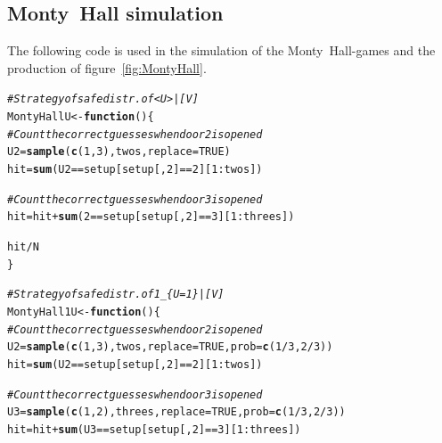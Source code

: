 \documentclass[twoside,a4paper]{article}
\makeatletter
\theoremstyle{plain}
\theoremstyle{definition}
\theoremstyle{remark}
\numberwithin{equation}{section}
\newcommand{\hlnum}[1]{\textcolor[rgb]{0.686,0.059,0.569}{#1}}%
\newcommand{\hlcom}[1]{\textcolor[rgb]{0.678,0.584,0.686}{\textit{#1}}}%
\newcommand{\hlopt}[1]{\textcolor[rgb]{0,0,0}{#1}}%
\newcommand{\hlstd}[1]{\textcolor[rgb]{0.345,0.345,0.345}{#1}}%
\newcommand{\hlkwa}[1]{\textcolor[rgb]{0.161,0.373,0.58}{\textbf{#1}}}%
\newcommand{\hlkwb}[1]{\textcolor[rgb]{0.69,0.353,0.396}{#1}}%
\newcommand{\hlkwc}[1]{\textcolor[rgb]{0.333,0.667,0.333}{#1}}%
\newcommand{\hlkwd}[1]{\textcolor[rgb]{0.737,0.353,0.396}{\textbf{#1}}}%
\newenvironment{kframe}{%
 \def\at@end@of@kframe{}%
 \ifinner\ifhmode%
  \def\at@end@of@kframe{\end{minipage}}%
  \begin{minipage}{\columnwidth}%
 \fi\fi%
 \def\FrameCommand##1{\hskip\@totalleftmargin \hskip-\fboxsep
 \colorbox{shadecolor}{##1}\hskip-\fboxsep
     \hskip-\linewidth \hskip-\@totalleftmargin \hskip\columnwidth}%
 \MakeFramed {\advance\hsize-\width
   \@totalleftmargin\z@ \linewidth\hsize
   \@setminipage}}%
 {\par\unskip\endMakeFramed%
 \at@end@of@kframe}
\newenvironment{knitrout}{}{} %
\DeclareMathOperator{\1}{\mathbbm{1}}
\makeatother
\begin{document}
\subsection{Monty~Hall simulation}\label{app:MontyHallSim}
The following code is used in the simulation of the Monty~Hall-games and the production of figure~\ref{fig:MontyHall}.
\begin{knitrout}
\color{fgcolor}\begin{kframe}
\begin{alltt}
\hlcom{# Strategy of safe distr. of <U>|[V]}
\hlstd{MontyHallU} \hlkwb{<-} \hlkwa{function} \hlstd{() \{}
  \hlcom{# Count the correct guesses when door 2 is opened}
  \hlstd{U2} \hlkwb{=} \hlkwd{sample}\hlstd{(}\hlkwd{c}\hlstd{(}\hlnum{1}\hlstd{,}\hlnum{3}\hlstd{), twos,} \hlkwc{replace} \hlstd{=} \hlnum{TRUE}\hlstd{)}
  \hlstd{hit} \hlkwb{=} \hlkwd{sum}\hlstd{(U2} \hlopt{==} \hlstd{setup[setup[,}\hlnum{2}\hlstd{]} \hlopt{==} \hlnum{2}\hlstd{][}\hlnum{1}\hlopt{:}\hlstd{twos])}

  \hlcom{# Count the correct guesses when door 3 is opened}
  \hlstd{hit} \hlkwb{=} \hlstd{hit} \hlopt{+} \hlkwd{sum}\hlstd{(}\hlnum{2} \hlopt{==} \hlstd{setup[setup[,}\hlnum{2}\hlstd{]} \hlopt{==} \hlnum{3}\hlstd{][}\hlnum{1}\hlopt{:}\hlstd{threes])}

  \hlstd{hit}\hlopt{/}\hlstd{N}
\hlstd{\}}

\hlcom{# Strategy of safe distr. of 1_\{U=1\}|[V]}
\hlstd{MontyHall1U} \hlkwb{<-} \hlkwa{function}\hlstd{() \{}
  \hlcom{# Count the correct guesses when door 2 is opened}
  \hlstd{U2} \hlkwb{=} \hlkwd{sample}\hlstd{(}\hlkwd{c}\hlstd{(}\hlnum{1}\hlstd{,}\hlnum{3}\hlstd{), twos,} \hlkwc{replace} \hlstd{=} \hlnum{TRUE}\hlstd{,} \hlkwc{prob} \hlstd{=} \hlkwd{c}\hlstd{(}\hlnum{1}\hlopt{/}\hlnum{3}\hlstd{,}\hlnum{2}\hlopt{/}\hlnum{3}\hlstd{))}
  \hlstd{hit} \hlkwb{=} \hlkwd{sum}\hlstd{(U2} \hlopt{==} \hlstd{setup[setup[,}\hlnum{2}\hlstd{]} \hlopt{==} \hlnum{2}\hlstd{][}\hlnum{1}\hlopt{:}\hlstd{twos])}

  \hlcom{# Count the correct guesses when door 3 is opened}
  \hlstd{U3} \hlkwb{=} \hlkwd{sample}\hlstd{(}\hlkwd{c}\hlstd{(}\hlnum{1}\hlstd{,}\hlnum{2}\hlstd{), threes,} \hlkwc{replace} \hlstd{=} \hlnum{TRUE}\hlstd{,} \hlkwc{prob} \hlstd{=} \hlkwd{c}\hlstd{(}\hlnum{1}\hlopt{/}\hlnum{3}\hlstd{,}\hlnum{2}\hlopt{/}\hlnum{3}\hlstd{))}
  \hlstd{hit} \hlkwb{=} \hlstd{hit} \hlopt{+} \hlkwd{sum}\hlstd{(U3} \hlopt{==} \hlstd{setup[setup[,}\hlnum{2}\hlstd{]} \hlopt{==} \hlnum{3}\hlstd{][}\hlnum{1}\hlopt{:}\hlstd{threes])}


\end{alltt}
\end{kframe}
\end{knitrout}
\end{document}
